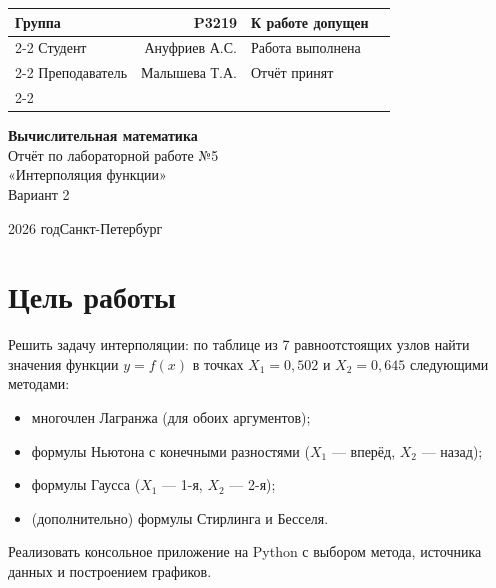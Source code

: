 \documentclass[a4paper,12pt]{article}
\begin{document}
\begin{table}[htbp]
    \centering
    \begin{tabular}{lrlr}
        Группа        & \qquad\qquad P3219          & К работе допущен & \qquad\qquad\qquad\qquad\qquad \\
        \cmidrule{2-2}\cmidrule{4-4}
        Студент       & \qquad\qquad Ануфриев А.С.  & Работа выполнена & \qquad\qquad\qquad\qquad\qquad \\
        \cmidrule{2-2}\cmidrule{4-4}
        Преподаватель & \qquad\qquad Малышева Т.А.  & Отчёт принят     & \qquad\qquad\qquad\qquad\qquad \\
        \cmidrule{2-2}\cmidrule{4-4}
    \end{tabular}
\end{table}

\vspace{2cm}
\begin{center}
    {\LARGE\bfseries Вычислительная математика}\\[10pt]
    {\Large Отчёт по лабораторной работе №5}\\[6pt]
    {\large «Интерполяция функции»}\\[6pt]
    {\normalsize Вариант 2}
\end{center}

\vspace{8cm}
\begin{center}2026 год\quad Санкт-Петербург\end{center}

\newpage
\tableofcontents

\newpage
\section{Цель работы}

Решить задачу интерполяции: по таблице из 7 равноотстоящих узлов найти
значения функции $y=f(x)$ в точках $X_1=0{,}502$ и $X_2=0{,}645$
следующими методами:
\begin{itemize}
    \item многочлен Лагранжа (для обоих аргументов);
    \item формулы Ньютона с конечными разностями ($X_1$ --- вперёд, $X_2$ --- назад);
    \item формулы Гаусса ($X_1$ --- 1-я, $X_2$ --- 2-я);
    \item (дополнительно) формулы Стирлинга и Бесселя.
\end{itemize}
Реализовать консольное приложение на Python с выбором метода, источника
данных и построением графиков.
\end{document}
